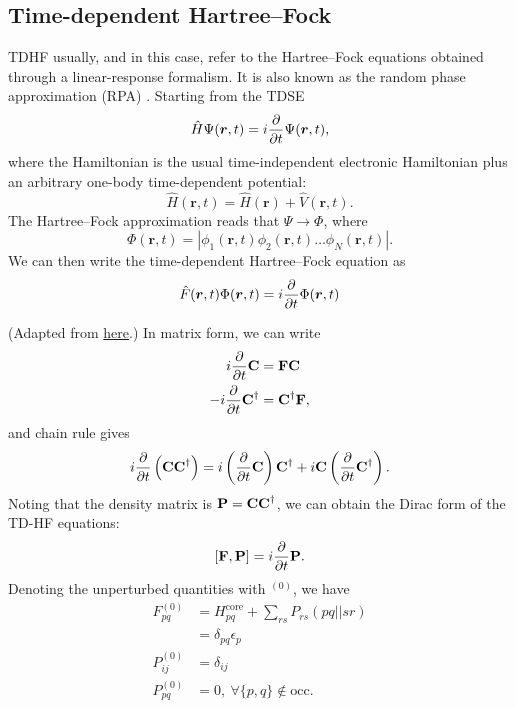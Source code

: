 \documentclass{article}
\begin{document}
\subsection{Time-dependent Hartree--Fock}
TDHF usually, and in this case, refer to the Hartree--Fock equations obtained through a linear-response formalism. It is also known as the random phase approximation (RPA) \cite{dreuwSingleReferenceInitioMethods2005}. Starting from the TDSE
\begin{equation}
\hat{H}\Psi(\bm{r},t)=i\diffp{}{t}\Psi(\bm{r},t),
\end{equation}
where the Hamiltonian is the usual time-independent electronic Hamiltonian plus an arbitrary one-body time-dependent potential:
\begin{equation}
\hat{H}(\bm{r},t)=\hat{H}(\bm{r})+\hat{V}(\bm{r},t).
\end{equation}
The Hartree--Fock approximation reads that $\Psi\rightarrow\Phi$, where
\begin{equation}
\Phi(\bm{r},t)=|\phi_1(\bm{r},t)\phi_2(\bm{r},t)\dots\phi_N(\bm{r},t)|.
\end{equation}
We can then write the time-dependent Hartree--Fock equation as
\begin{equation}
\hat{F}(\bm{r},t)\Phi(\bm{r},t)=i\diffp{}{t}\Phi(\bm{r},t)
\end{equation}

(Adapted from \href{https://joshuagoings.com/2013/05/03/derivation-of-time-dependent-hartree-fock-tdhf-equations/}{here}.) In matrix form, we can write
\begin{align}
i\diffp{}{t}\bvec{C}&=\bvec{F}\bvec{C}\\
-i\diffp{}{t}\bvec{C}^{\dagger}&=\bvec{C}^{\dagger}\bvec{F},
\end{align}
and chain rule gives
\begin{equation}
    i\diffp{}{t}\left( \bvec{C}\bvec{C}^{\dagger} \right)=i\left( \diffp{}{t}\bvec{C} \right)\bvec{C}^{\dagger}+i\bvec{C}\left( \diffp{}{t}\bvec{C}^{\dagger} \right).
\end{equation}
Noting that the density matrix is $\bm{\mathrm{P}}=\bm{\mathrm{C}}\bm{\mathrm{C}}^{\dagger}$, we can obtain the Dirac form of the TD-HF equations:
\begin{equation}
\label{eq:dirac-td-hf}
    [\bvec{F},\bvec{P}]=i\diffp{}{t}\bvec{P}.
\end{equation}
Denoting the unperturbed quantities with $^{(0)}$, we have
\begin{align}
    F_{pq}^{(0)}&=H^{\mathrm{core}}_{pq}+\sum_{rs}P_{rs}(pq||sr)\\
                &=\delta_{pq}\epsilon_p\\
    P_{ij}^{(0)}&=\delta_{ij}\\
    P_{pq}^{(0)}&=0,\ \forall\{p,q\}\notin\mathrm{occ}.
\end{align}
\end{document}
